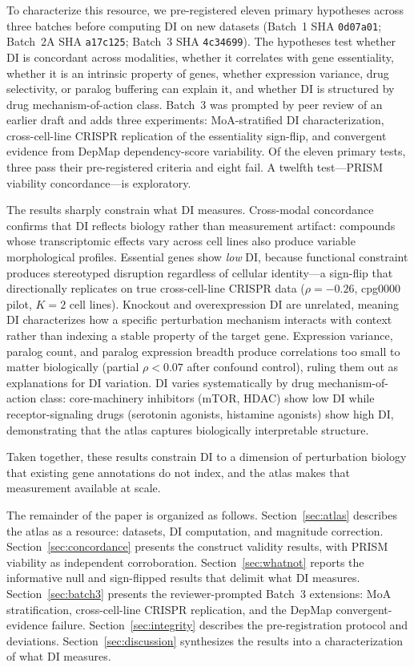 \documentclass[11pt]{article}
\begin{document}
To characterize this resource, we pre-registered eleven primary
hypotheses across three batches before computing DI on new datasets
(Batch~1 SHA \texttt{0d07a01}; Batch~2A SHA \texttt{a17c125};
Batch~3 SHA \texttt{4c34699}).  The
hypotheses test whether DI is concordant across modalities,
whether it correlates with gene essentiality, whether it is an
intrinsic property of genes, whether expression variance,
drug selectivity, or paralog buffering can explain it, and whether
DI is structured by drug mechanism-of-action class.
Batch~3 was prompted by peer review of an earlier draft and adds three
experiments: MoA-stratified DI characterization, cross-cell-line CRISPR
replication of the essentiality sign-flip, and convergent evidence from
DepMap dependency-score variability.
Of the eleven primary tests, three pass their pre-registered criteria
and eight fail.  A twelfth test---PRISM viability concordance---is
exploratory.

The results sharply constrain what DI measures.  Cross-modal concordance confirms
that DI reflects biology rather than measurement artifact: compounds
whose transcriptomic effects vary across cell lines also produce
variable morphological profiles.  Essential genes show \emph{low} DI, because functional
constraint produces stereotyped disruption regardless of cellular
identity---a sign-flip that directionally replicates on true
cross-cell-line CRISPR data ($\rho = -0.26$, cpg0000 pilot, $K = 2$
cell lines).  Knockout and overexpression DI are unrelated, meaning DI
characterizes how a specific perturbation mechanism interacts with
context rather than indexing a stable property of the target gene.
Expression variance, paralog count, and paralog expression breadth
produce correlations too small to matter biologically (partial
$\rho < 0.07$ after confound control), ruling them out as explanations
for DI variation.  DI varies systematically by drug mechanism-of-action
class: core-machinery inhibitors (mTOR, HDAC) show low DI while
receptor-signaling drugs (serotonin agonists, histamine agonists)
show high DI, demonstrating that the atlas captures biologically
interpretable structure.

Taken together, these results constrain DI to a dimension of
perturbation biology that existing gene annotations do not index, and
the atlas makes that measurement available at scale.

The remainder of the paper is organized as follows.
Section~\ref{sec:atlas} describes the atlas as a resource: datasets,
DI computation, and magnitude correction.
Section~\ref{sec:concordance} presents the construct validity results,
with PRISM viability as independent corroboration.
Section~\ref{sec:whatnot} reports the informative null and sign-flipped
results that delimit what DI measures.
Section~\ref{sec:batch3} presents the reviewer-prompted Batch~3
extensions: MoA stratification, cross-cell-line CRISPR replication,
and the DepMap convergent-evidence failure.
Section~\ref{sec:integrity} describes the pre-registration protocol and
deviations.
Section~\ref{sec:discussion} synthesizes the results into a
characterization of what DI measures.
\end{document}
